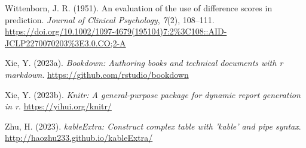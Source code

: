 \documentclass[
]{article}
\newlength{\cslhangindent}
\newenvironment{CSLReferences}[2] %
 {\begin{list}{}{%
  \setlength{\itemindent}{0pt}
  \setlength{\leftmargin}{0pt}
  \setlength{\parsep}{0pt}
  \ifodd #1
   \setlength{\leftmargin}{\cslhangindent}
   \setlength{\itemindent}{-1\cslhangindent}
  \fi
  \setlength{\itemsep}{#2\baselineskip}}}
 {\end{list}}
\begin{document}
\begin{CSLReferences}{1}{0}
Wittenborn, J. R. (1951). {An evaluation of the use of difference scores in prediction}. \emph{Journal of Clinical Psychology}, \emph{7}(2), 108--111. \url{https://doi.org/10.1002/1097-4679(195104)7:2\%3C108::AID-JCLP2270070203\%3E3.0.CO;2-A}

Xie, Y. (2023a). \emph{Bookdown: Authoring books and technical documents with r markdown}. \url{https://github.com/rstudio/bookdown}

Xie, Y. (2023b). \emph{Knitr: A general-purpose package for dynamic report generation in r}. \url{https://yihui.org/knitr/}

Zhu, H. (2023). \emph{kableExtra: Construct complex table with 'kable' and pipe syntax}. \url{http://haozhu233.github.io/kableExtra/}

\end{CSLReferences}
\end{document}
